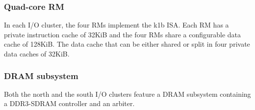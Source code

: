 \documentclass[main.tex]{subfiles}
\begin{document}
\subsubsection{Quad-core RM}
In each I/O cluster, the four RMs implement the k1b ISA. Each RM has a private
instruction cache of 32KiB and the four RMs share a configurable data cache of
128KiB. The data cache that can be either shared or split in four private data
caches of 32KiB.

\subsubsection{DRAM subsystem}
\label{sssec_systemModel_MPPADRAMarbiter}
Both the north and the south I/O clusters feature a DRAM subsystem containing a
DDR3-SDRAM controller and an arbiter.
\end{document}
